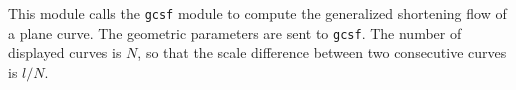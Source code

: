 This module calls the \verb+gcsf+ module to compute the generalized shortening
flow of a plane curve. The geometric parameters are sent to \verb+gcsf+. The
number of displayed curves is $N$, so that the scale difference  between two
consecutive curves is $l/N$.